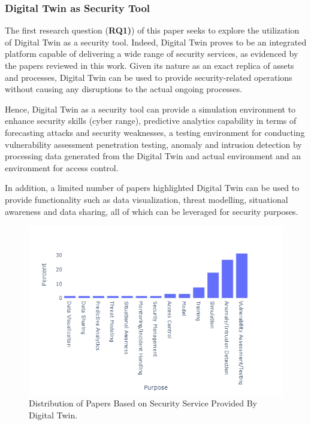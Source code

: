 \subsubsection*{Digital Twin as Security Tool}

The first research question (\textbf{RQ1)}) of this paper seeks to explore the utilization of Digital Twin as a security tool. Indeed, Digital Twin proves to be an integrated platform capable of delivering a wide range of security services, as evidenced by the papers reviewed in this work. Given its nature as an exact replica of assets and processes, Digital Twin can be used to provide security-related operations without causing any disruptions to the actual ongoing processes.

Hence, Digital Twin as a security tool can provide a simulation environment to enhance security skills (cyber range), predictive analytics capability in terms of forecasting attacks and security weaknesses, a testing environment for conducting vulnerability assessment penetration testing, anomaly and intrusion detection by processing data generated from the Digital Twin and actual environment and an environment for access control. 

In addition, a limited number of papers highlighted Digital Twin can be used to provide functionality such as data visualization, threat modelling, situational awareness and data sharing, all of which can be leveraged for security purposes. 


\begin{figure}[H]    
    {
        \centering
        \includegraphics[width=1\textwidth]{images/rt/dt-securityservice.png}
        \caption{Distribution of Papers Based on Security Service Provided By Digital Twin.}
        \label{fig:use}
    }
\end{figure}

